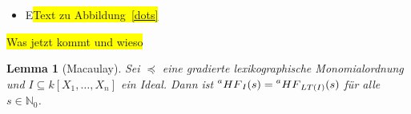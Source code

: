 \documentclass{article}
\newtheorem{lemma}[satz]{Lemma}
\newcommand*{\R}{k[X_{1},\ldots,X_{n}]}
\begin{document}
\begin{itemize}
\begin{proof}[Beweis]
	Damit folgt die Behauptung nach dem Induktionsprinzip.
	\end{proof}
	
	Sei nun \(I = \{0\}\). Dann ist mit Satz~\ref{1.2.8} und dem Theorem aus der Kombinatorik
		\begin{align*}
			\prescript{a}{}{HF}_{I}(s) &= dim_{k}(\R_{\leq s}/I_{\leq s}) \\
			&= dim_{k}(\R_{\leq s}) \\
			&= |\{ X^{\alpha} \in \R\, |\; deg(X^{\alpha}) \leq s\}| \\
			&= |\{ \alpha \in \mathbb{N}^{n}_{0}\, |\; |\alpha| \leq s\}| = |M_{n,s}| \\
			&= \binom{s+n}{s} = \binom{s+n}{n} \\
			&= \frac{1}{n!}(s+n)(s+n-1)\cdots (s+1) \\
			&= \frac{1}{n!}s^{n} + \frac{1}{n!}\binom{n+1}{2}s^{n-1} + \cdots + 1. \\
		\end{align*}
	\colorbox{yellow}{Zu beachten ist hier, dass der Grad der Hilbertfunktion n ist, also der Dimension von \(\R/I\)
	entspricht. Dies werden wir im Folgenden näher betrachten.}
	\item E\colorbox{yellow}{Text zu Abbildung~\ref{dots}}
	\end{itemize}
	

	\colorbox{yellow}{Was jetzt kommt und wieso}


	\begin{lemma}[Macaulay] \label{1.2.13}
	Sei \(\preceq\) eine gradierte lexikographische Monomialordnung und \(I \subseteq \R\) ein
	Ideal. Dann ist \(\prescript{a}{}{HF}_{I}(s) = \prescript{a}{}{HF}_{LT(I)}(s)\) für alle
	\(s \in \mathbb{N}_{0}\).
	\end{lemma}
\end{document}

